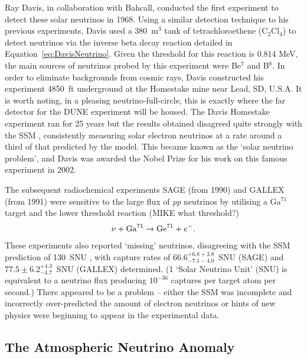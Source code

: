 Ray Davis, in collaboration with Bahcall, conducted the first experiment to detect these solar neutrinos in 1968.  Using a similar detection technique to his previous experiments, Davis used a 380~m$^3$ tank of tetrachloroethene (C$_2$Cl$_4$) to detect neutrinos via the inverse beta decay reaction detailed in Equation~\ref{eq:DavisNeutrino}.  Given the threshold for this reaction is 0.814 MeV, the main sources of neutrinos probed by this experiment were Be$^7$ and B$^8$.  In order to eliminate backgrounds from cosmic rays, Davis constructed his experiment 4850~ft underground at the Homestake mine near Lead, SD, U.S.A.  It is worth noting, in a pleasing neutrino-full-circle, this is exactly where the far detector for the DUNE experiment will be housed.  The Davis Homestake experiment ran for 25 years but the results obtained \cite{Cleveland1995} disagreed quite strongly with the SSM \cite{Bahcall1995}, consistently measuring solar electron neutrinos at a rate around a third of that predicted by the model.  This became known as the `solar neutrino problem', and Davis was awarded the Nobel Prize for his work on this famous experiment in 2002.

The subsequent radiochemical experiments SAGE (from 1990) and GALLEX (from 1991) were sensitive to the large flux of \textit{pp} neutrinos by utilising a Ga$^{71}$ target and the lower threshold reaction (MIKE what threshold?)
\begin{equation}
\nu + \textnormal{Ga}^{71} \rightarrow \textnormal{Ge}^{71} + e^-.
\end{equation}
These experiments also reported `missing' neutrinos, disagreeing with the SSM prediction of 130~SNU \cite{Hampel1999}, with capture rates of $66.6^{+6.8+3.8}_{-7.1-4.0}$~SNU (SAGE) \cite{Abdurashitov1994} and $77.5\pm6.2^{+4.3}_{-4.7}$~SNU (GALLEX) \cite{Anselmann1992} determined.  (1 `Solar Neutrino Unit' (SNU) is equivalent to a neutrino flux producing $10^{-36}$ captures per target atom per second.)  There appeared to be a problem -- either the SSM was incomplete and incorrectly over-predicted the amount of electron neutrinos or hints of new physics were beginning to appear in the experimental data.

\subsection{The Atmospheric Neutrino Anomaly}\label{sec:AtmosphericNeutrinoAnomaly}


